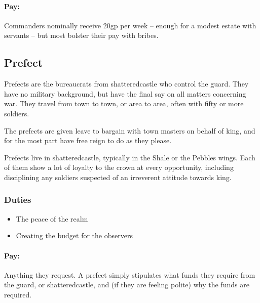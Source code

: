 \begin{multicols}{2}
\paragraph{Pay:}
Commanders nominally receive 20gp per week -- enough for a modest estate with servants -- but most bolster their pay with bribes.

\subsection{Prefect}

Prefects are the bureaucrats from \gls{shatteredcastle} who control the \gls{guard}.
They have no military background, but have the final say on all matters concerning war.
They travel from town to town, or area to area, often with fifty or more soldiers.

The prefects are given leave to bargain with town masters on behalf of \gls{king}, and for the most part have free reign to do as they please.

Prefects live in \gls{shatteredcastle}, typically in the Shale or the Pebbles wings.
Each of them show a lot of loyalty to the crown at every opportunity, including disciplining any soldiers suspected of an irreverent attitude towards \gls{king}.

\subsubsection{Duties}

\begin{itemize}

  \item
  The peace of the realm
  \item
  Creating the budget for the observers

\end{itemize}

\paragraph{Pay:}
Anything they request.
A prefect simply stipulates what funds they require from the \gls{guard}, or \gls{shatteredcastle}, and (if they are feeling polite) why the funds are required.

\end{multicols}
